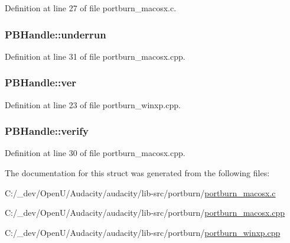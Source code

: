 Definition at line 27 of file portburn\+\_\+macosx.\+c.

\subsubsection[{\texorpdfstring{underrun}{underrun}}]{ P\+B\+Handle\+::underrun}\hypertarget{struct_p_b_handle_a64d77979344b7a77e06e82fbd6b26bcb}{}\label{struct_p_b_handle_a64d77979344b7a77e06e82fbd6b26bcb}


Definition at line 31 of file portburn\+\_\+macosx.\+cpp.

\subsubsection[{\texorpdfstring{ver}{ver}}]{ P\+B\+Handle\+::ver}\hypertarget{struct_p_b_handle_a56432885c220c0c95233669d02193f30}{}\label{struct_p_b_handle_a56432885c220c0c95233669d02193f30}


Definition at line 23 of file portburn\+\_\+winxp.\+cpp.

\subsubsection[{\texorpdfstring{verify}{verify}}]{ P\+B\+Handle\+::verify}\hypertarget{struct_p_b_handle_a690a729e71fd49142f0da5601da53b7f}{}\label{struct_p_b_handle_a690a729e71fd49142f0da5601da53b7f}


Definition at line 30 of file portburn\+\_\+macosx.\+cpp.



The documentation for this struct was generated from the following files\+:\begin{DoxyCompactItemize}
\item 
C\+:/\+\_\+dev/\+Open\+U/\+Audacity/audacity/lib-\/src/portburn/\hyperlink{portburn__macosx_8c}{portburn\+\_\+macosx.\+c}\item 
C\+:/\+\_\+dev/\+Open\+U/\+Audacity/audacity/lib-\/src/portburn/\hyperlink{portburn__macosx_8cpp}{portburn\+\_\+macosx.\+cpp}\item 
C\+:/\+\_\+dev/\+Open\+U/\+Audacity/audacity/lib-\/src/portburn/\hyperlink{portburn__winxp_8cpp}{portburn\+\_\+winxp.\+cpp}\end{DoxyCompactItemize}
